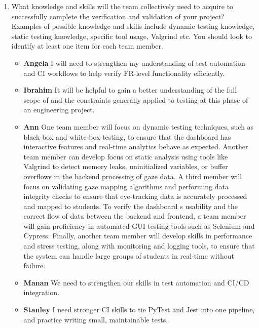 \documentclass[12pt, titlepage]{article}
\begin{document}
\begin{enumerate}
  \item What knowledge and skills will the team collectively need to acquire to
  successfully complete the verification and validation of your project?
  Examples of possible knowledge and skills include dynamic testing knowledge,
  static testing knowledge, specific tool usage, Valgrind etc.  You should look to
  identify at least one item for each team member.
  \begin{itemize}
      \item \textbf{Angela} I will need to strengthen my understanding of test automation and CI workflows to help verify FR-level functionality efficiently.
      \item \textbf{Ibrahim} It will be helpful to gain a better understanding of the full scope of and the constraints generally applied to testing at this phase of an engineering project.
      \item \textbf{Ann} One team member will focus on dynamic testing techniques, such as black-box and white-box testing, to ensure that the dashboard has interactive features and real-time analytics behave as expected. Another team member can develop focus on static analysis using tools like Valgrind to detect memory leaks, uninitialized variables, or buffer overflows in the backend processing of gaze data. A third member will focus on validating gaze mapping algorithms and performing data integrity checks to ensure that eye-tracking data is accurately processed and mapped to students. To verify the dashboard s usability and the correct flow of data between the backend and frontend, a team member will gain proficiency in automated GUI testing tools such as Selenium and Cypress. Finally, another team member will develop skills in performance and stress testing, along with monitoring and logging tools, to ensure that the system can handle large groups of students in real-time without failure.
      \item \textbf{Manan} We need to strengthen our skills in test automation and CI/CD integration.
      \item \textbf{Stanley} I need stronger CI skills to tie PyTest and Jest into one pipeline, and practice writing small, maintainable tests.
    \end{itemize}


\end{enumerate}
\end{document}
